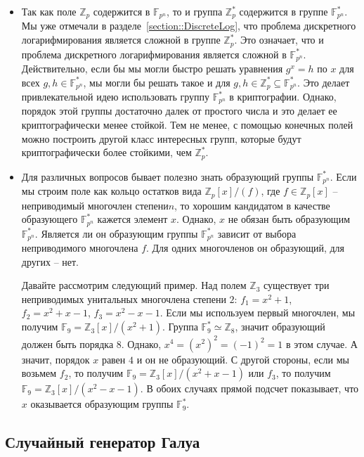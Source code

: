 \begin{remarks}
\begin{itemize}
\item 
Так как поле $\mathbb Z_p$ содержится в $\mathbb F_{p^n}$, то и группа $\mathbb Z_p^*$ содержится в группе $\mathbb F_{p^n}^*$.
Мы уже отмечали в разделе~\ref{section::DiscreteLog}, что проблема дискретного логарифмирования является сложной в группе $\mathbb Z_p^*$.
Это означает, что и проблема дискретного логарифмирования является сложной в $\mathbb F_{p^n}^*$.
Действительно, если бы мы могли быстро решать уравнения $g^x = h$ по $x$ для всех $g,h \in \mathbb F_{p^n}^*$, мы могли бы решать такое и для $g, h\in \mathbb Z_p^* \subseteq \mathbb F_{p^n}^*$.
Это делает привлекательной идею использовать группу $\mathbb F_{p^n}^*$ в криптографии.
Однако, порядок этой группы достаточно далек от простого числа и это делает ее криптографически менее стойкой.
Тем не менее, с помощью конечных полей можно построить другой класс интересных групп, которые будут криптографически более стойкими, чем $\mathbb Z_p^*$.

\item
Для различных вопросов бывает полезно знать образующий группы $\mathbb F_{p^n}^*$.
Если мы строим поле как кольцо остатков вида $\mathbb Z_p[x]/(f)$, где $f\in \mathbb Z_p[x]$ -- неприводимый многочлен степени$n$, то хорошим кандидатом в качестве образующего $\mathbb F_{p^n}^*$ кажется элемент $x$.
Однако, $x$ не обязан быть образующим $\mathbb F_{p^n}^*$.
Является ли он образующим группы $\mathbb F_{p^n}^*$ зависит от выбора неприводимого многочлена $f$.
Для одних многочленов он образующий, для других -- нет.

Давайте рассмотрим следующий пример.
Над полем $\mathbb Z_3$ существует три неприводимых унитальных многочлена степени $2$: $f_1 = x^2+1$, $f_2 = x^2 + x - 1$, $f_3 = x^2 - x - 1$.
Если мы используем первый многочлен, мы получим $\mathbb F_9 = \mathbb Z_3[x]/(x^2 + 1)$.
Группа $\mathbb F_9^* \simeq \mathbb Z_8$, значит образующий должен быть порядка $8$.
Однако, $x^4 = (x^2)^2=(-1)^2 = 1$ в этом случае.
А значит, порядок $x$ равен $4$ и он не образующий.
С другой стороны, если мы возьмем $f_2$, то получим $\mathbb F_9 = \mathbb Z_3[x]/(x^2+x-1)$ или $f_3$, то получим $\mathbb F_9 = \mathbb Z_3[x]/(x^2-x-1)$.
В обоих случаях прямой подсчет показывает, что $x$ оказывается образующим группы $\mathbb F_9^*$.
\end{itemize}
\end{remarks}

\subsection{Случайный генератор Галуа}

